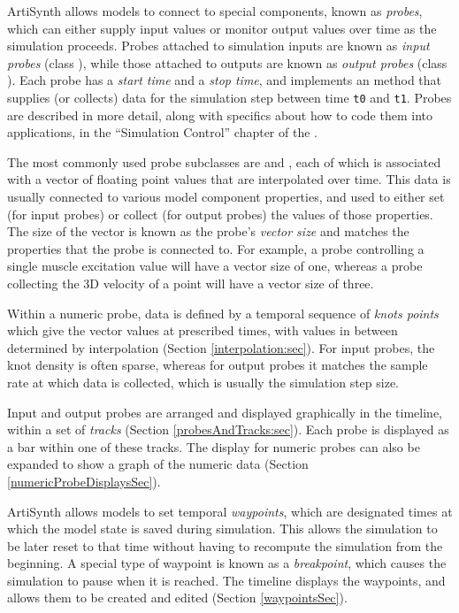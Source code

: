 \documentclass{article}
\begin{document}
ArtiSynth allows models to connect to special components, known as
{\it probes}, which can either supply input values or monitor output
values over time as the simulation proceeds. Probes attached to
simulation inputs are known as {\it input probes} (class
), while those attached
to outputs are known as {\it output probes} (class
).  Each probe has a
{\it start time} and a {\it stop time}, and implements an
 method
that supplies (or collects) data for the simulation step between time
{\tt t0} and {\tt t1}.  Probes are described in more detail, along
with specifics about how to code them into applications, in the
``Simulation Control'' chapter of the
.

The most commonly used probe subclasses are
 and
, each of which
is associated with a vector of floating point values that are
interpolated over time. This data is usually connected to various
model component properties, and used to either set (for input probes)
or collect (for output probes) the values of those properties. The
size of the vector is known as the probe's {\it vector size} and
matches the properties that the probe is connected to. For example, a
probe controlling a single muscle excitation value will have a vector
size of one, whereas a probe collecting the 3D velocity of a point
will have a vector size of three.

Within a numeric probe, data is defined by a temporal sequence of {\it
knots points} which give the vector values at prescribed times, with
values in between determined by interpolation (Section
\ref{interpolation:sec}). For input probes, the knot density is often
sparse, whereas for output probes it matches the sample rate at which
data is collected, which is usually the simulation step size.

Input and output probes are arranged and displayed graphically in the
timeline, within a set of {\it tracks} (Section
\ref{probesAndTracks:sec}). Each probe is displayed as a bar within
one of these tracks. The display for numeric probes can also be
expanded to show a graph of the numeric data (Section
\ref{numericProbeDisplaysSec}).

ArtiSynth allows models to set temporal {\it waypoints}, which are
designated times at which the model state is saved during
simulation. This allows the simulation to be later reset to that time
without having to recompute the simulation from the beginning.  A
special type of waypoint is known as a {\it breakpoint}, which causes
the simulation to pause when it is reached. The timeline displays the
waypoints, and allows them to be created and edited (Section
\ref{waypointsSec}).
\end{document}
